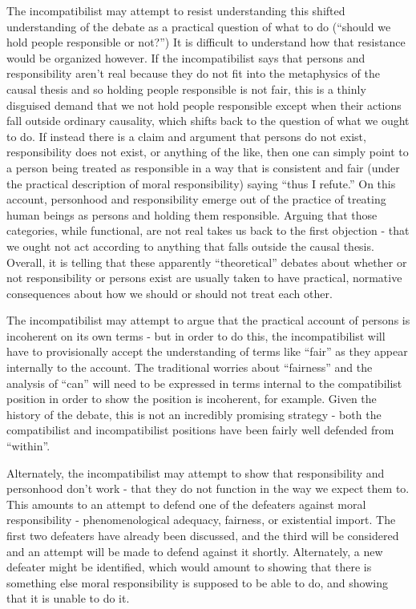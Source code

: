 \documentclass[phd,12pt,oneside,paper=letterpaper]{ubcthesis}
\begin{document}
The incompatibilist may attempt to resist understanding this shifted understanding of the debate as a practical question of what to do (``should we hold people responsible or not?'') It is difficult to understand how that resistance would be organized however. If the incompatibilist says that persons and responsibility aren't real because they do not fit into the metaphysics of the causal thesis and so holding people responsible is not fair, this is a thinly disguised demand that we not hold people responsible except when their actions fall outside ordinary causality, which shifts back to the question of what we ought to do. If instead there is a claim and argument that persons do not exist, responsibility does not exist, or anything of the like, then one can simply point to a person being treated as responsible in a way that is consistent and fair (under the practical description of moral responsibility) saying ``thus I refute.'' On this account, personhood and responsibility emerge out of the practice of treating human beings as persons and holding them responsible. Arguing  that those categories, while functional, are not real takes us back to the first objection - that we ought not act according to anything that falls outside the causal thesis. Overall, it is telling that these apparently ``theoretical'' debates about whether or not responsibility or persons exist are usually taken to have practical, normative consequences about how we should or should not treat each other. 

The incompatibilist may attempt to argue that the practical account of persons is incoherent on its own terms - but in order to do this, the incompatibilist will have to provisionally accept the understanding of terms like ``fair'' as they appear internally to the account. The traditional worries about ``fairness'' and the analysis of ``can'' will need to be expressed in terms internal to the compatibilist position in order to show the position is incoherent, for example. Given the history of the debate, this is not an incredibly promising strategy - both the compatibilist and incompatibilist positions have been fairly well defended from ``within''.

Alternately, the incompatibilist may attempt to show that responsibility and personhood don't work - that they do not function in the way we expect them to. This amounts to an attempt to defend one of the defeaters against moral responsibility - phenomenological adequacy, fairness, or existential import. The first two defeaters have already been discussed, and the third will be considered and an attempt will be made to defend against it shortly. Alternately, a new defeater might be identified, which would amount to showing that there is something else moral responsibility is supposed to be able to do, and showing that it is unable to do it. 
\end{document}
